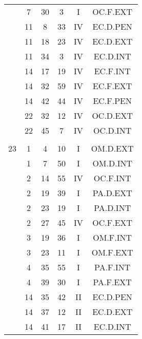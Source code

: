 \documentclass[12pt, a4paper]{article}
\begin{document}
\begin{multicols}{3}
{\begin{tabular}{c c c c c c}
	 	 	 	 & 7 & 30 & 3 & I & OC.F.EXT\\%
	 	 	 	 & 11 & 8 & 33 & IV & EC.D.PEN\\%
	 	 	 	 & 11 & 18 & 23 & IV & EC.D.EXT\\%
	 	 	 	 & 11 & 34 & 3 & IV & EC.D.INT\\%
	 	 	 	 & 14 & 17 & 19 & IV & EC.F.INT\\%
	 	 	 	 & 14 & 32 & 59 & IV & EC.F.EXT\\%
	 	 	 	 & 14 & 42 & 44 & IV & EC.F.PEN\\%
	 	 	 	 & 22 & 32 & 12 & IV & OC.D.EXT\\%
	 	 	 	 & 22 & 45 & 7 & IV & OC.D.INT\\%
	 	 	 	 & & & & & \\%
	 	 	 	23 & 1 & 4 & 10 & I & OM.D.EXT\\%
	 	 	 	 & 1 & 7 & 50 & I & OM.D.INT\\%
	 	 	 	 & 2 & 14 & 55 & IV & OC.F.INT\\%
	 	 	 	 & 2 & 19 & 39 & I & PA.D.EXT\\%
	 	 	 	 & 2 & 23 & 19 & I & PA.D.INT\\%
	 	 	 	 & 2 & 27 & 45 & IV & OC.F.EXT\\%
	 	 	 	 & 3 & 19 & 36 & I & OM.F.INT\\%
	 	 	 	 & 3 & 23 & 11 & I & OM.F.EXT\\%
	 	 	 	 & 4 & 35 & 55 & I & PA.F.INT\\%
	 	 	 	 & 4 & 39 & 30 & I & PA.F.EXT\\%
	 	 	 	 & 14 & 35 & 42 & II & EC.D.PEN\\%
	 	 	 	 & 14 & 37 & 12 & II & EC.D.EXT\\%
	 	 	 	 & 14 & 41 & 17 & II & EC.D.INT\\%
	 	 \end{tabular}
 	}
\end{multicols}
\end{document}
